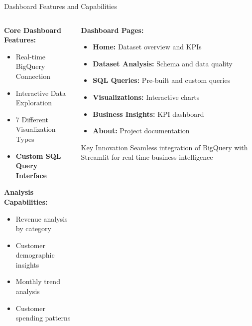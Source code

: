 \documentclass[aspectratio=169]{beamer}
\begin{document}
\begin{frame}{Dashboard Features and Capabilities}
\begin{columns}
\begin{column}{0.5\textwidth}
\textbf{Core Dashboard Features:}
\begin{itemize}
    \item \textcolor{myblue}{Real-time BigQuery Connection}
    \item \textcolor{mygreen}{Interactive Data Exploration}
    \item \textcolor{myred}{7 Different Visualization Types}
    \item \textbf{Custom SQL Query Interface}
\end{itemize}

\vspace{0.5cm}

\textbf{Analysis Capabilities:}
\begin{itemize}
    \item Revenue analysis by category
    \item Customer demographic insights
    \item Monthly trend analysis
    \item Customer spending patterns
\end{itemize}
\end{column}
\begin{column}{0.5\textwidth}
\textbf{Dashboard Pages:}
\begin{itemize}
    \item \textbf{Home:} Dataset overview and KPIs
    \item \textbf{Dataset Analysis:} Schema and data quality
    \item \textbf{SQL Queries:} Pre-built and custom queries
    \item \textbf{Visualizations:} Interactive charts
    \item \textbf{Business Insights:} KPI dashboard
    \item \textbf{About:} Project documentation
\end{itemize}

\vspace{0.5cm}
\begin{alertblock}{Key Innovation}
Seamless integration of BigQuery with Streamlit for real-time business intelligence
\end{alertblock}
\end{column}
\end{columns}
\end{frame}
\end{document}
